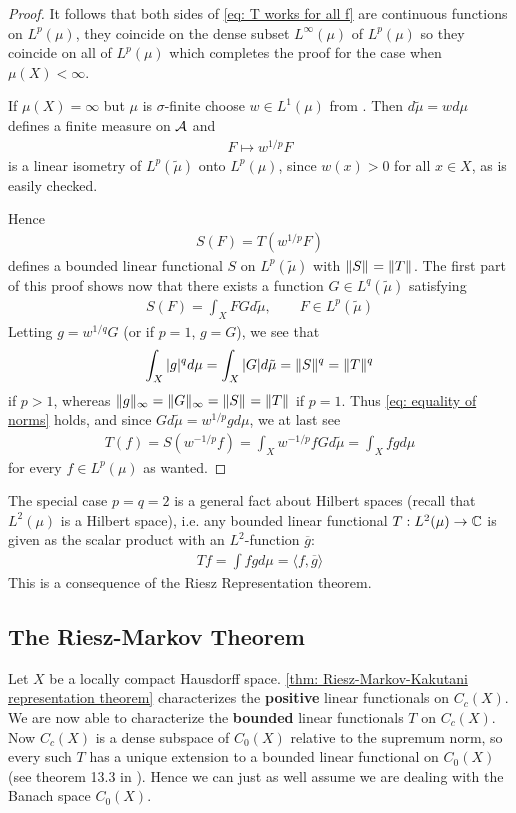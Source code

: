 \begin{proof}
It follows that both sides of \eqref{eq: T works for all f} are continuous functions on $L^{p}(\mu)$, they coincide on the dense subset $L^{\infty}(\mu)$ of $L^{p}(\mu)$ so they coincide on all of $L^{p}(\mu)$ which completes the proof for the case when $\mu(X)<\infty$.

If $\mu(X)=\infty$ but $\mu$ is $\sigma$-finite choose $w\in L^{1}(\mu)$ from . Then $d\tilde{\mu}=wd\mu$ defines a finite measure on $\m{A}$ and
\begin{align*}
	F\mapsto w^{1/p}F
\end{align*}
is a linear isometry of $L^{p}(\tilde{\mu})$ onto $L^{p}(\mu)$, since $w(x)>0$ for all $x\in X$, as is easily checked.

Hence
\begin{align*}
	S(F)=T(w^{1/p}F)
\end{align*}
defines a bounded linear functional $S$ on $L^{p}(\tilde{\mu})$ with $\norm{S}=\norm{T}$.
The first part of this proof shows now that there exists a function $G\in L^{q}(\tilde{\mu})$ satisfying
\begin{align*}
	S(F)=\int_{X}FGd\tilde{\mu}, \qquad F\in L^{p}(\tilde{\mu})
\end{align*}
Letting $g=w^{1/q}G$ (or if $p=1$, $g=G$), we see that
\begin{align*}
	\int_{X}|g|^{q}d\mu=\int_{X}|G|d\tilde{\mu}=\norm{S}^{q}=\norm{T}^{q}
\end{align*} 
if $p>1$, whereas $\norm[\infty]{g}=\norm[\infty]{G}=\norm{S}=\norm{T}$ if $p=1$. Thus \eqref{eq: equality of norms} holds, and since $Gd\tilde{\mu}=w^{1/p}gd\mu$, we at last see
\begin{align*}
	T(f)=S(w^{-1/p}f)=\int_{X}w^{-1/p}fGd\tilde{\mu}=\int_{X}fgd\mu
\end{align*}
for every $f\in L^{p}(\mu)$ as wanted.
\end{proof}

The special case $p=q=2$ is a general fact about Hilbert spaces (recall that $L^{2}(\mu)$ is a Hilbert space), i.e. any bounded linear functional $T:L^{2}(\mu)\to \C$ is given as the scalar product with an $L^{2}$-function $\overline{g}$:
\begin{align*}
	Tf=\int fg d\mu=\langle f,\overline{g} \rangle
\end{align*}
This is a consequence of the Riesz Representation theorem.

\subsection{The Riesz-Markov Theorem}
Let $X$ be a locally compact Hausdorff space. \cref{thm: Riesz-Markov-Kakutani representation theorem} characterizes the \textbf{positive} linear functionals on $C_{c}(X)$. We are now able to characterize the \textbf{bounded} linear functionals $T$ on $C_{c}(X)$. Now $C_{c}(X)$ is a dense subspace of $C_{0}(X)$ relative to the supremum norm, so every such $T$ has a unique extension to a bounded linear functional on $C_{0}(X)$ (see theorem 13.3 in \cite{Musat17}). Hence we can just as well assume we are dealing with the Banach space $C_{0}(X)$.

